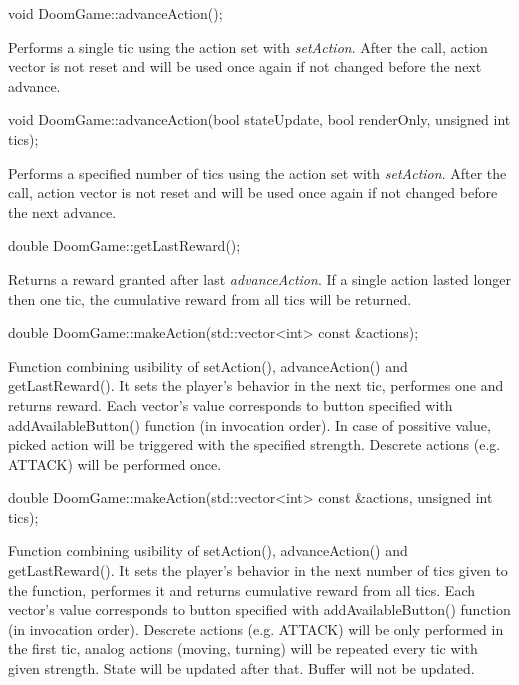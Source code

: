 \vspace{20pt}
\begin{clinee}
	void DoomGame::advanceAction();
\end{clinee}
	Performs a single tic using the action set with \emph{setAction}. After the call, action vector is not reset and will be used once again if not changed before the next advance.


\vspace{20pt}
\begin{clinee}
	void DoomGame::advanceAction(bool stateUpdate, bool renderOnly, unsigned int tics);
\end{clinee}
	Performs a specified number of tics using the action set with \emph{setAction}. After the call, action vector is not reset and will be used once again if not changed before the next advance.


\vspace{20pt}
\begin{clinee}
	double DoomGame::getLastReward();
\end{clinee}
	Returns a reward granted after last \emph{advanceAction}. If a single action lasted longer then one tic, the cumulative reward from all tics will be returned.


\vspace{20pt}
\begin{clinee}
	double DoomGame::makeAction(std::vector<int> const &actions);
\end{clinee}

Function combining usibility of setAction(), advanceAction() and getLastReward(). It sets the player's behavior in the next tic, performes one and returns reward.
Each vector's value corresponds to button specified with addAvailableButton() function (in invocation order).
In case of possitive value, picked action will be triggered with the specified strength. Descrete actions (e.g. ATTACK) will be performed once. 


\vspace{20pt}
\begin{clinee}
	double DoomGame::makeAction(std::vector<int> const &actions, unsigned int tics);
\end{clinee}

Function combining usibility of setAction(), advanceAction() and getLastReward(). It sets the player's behavior in the next number of tics given to the function, performes it and returns cumulative reward from all tics. Each vector's value corresponds to button specified with addAvailableButton() function (in invocation order). Descrete actions (e.g. ATTACK) will be only performed in the first tic, analog actions (moving, turning) will be repeated every tic with given strength.
State will be updated after that. Buffer will not be updated.


